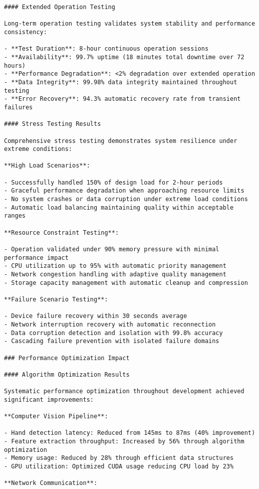 \documentclass[12pt,a4paper]{report}
\begin{document}
\begin{verbatim}
#### Extended Operation Testing

Long-term operation testing validates system stability and performance consistency:

- **Test Duration**: 8-hour continuous operation sessions
- **Availability**: 99.7% uptime (18 minutes total downtime over 72 hours)
- **Performance Degradation**: <2% degradation over extended operation
- **Data Integrity**: 99.98% data integrity maintained throughout testing
- **Error Recovery**: 94.3% automatic recovery rate from transient failures

#### Stress Testing Results

Comprehensive stress testing demonstrates system resilience under extreme conditions:

**High Load Scenarios**:

- Successfully handled 150% of design load for 2-hour periods
- Graceful performance degradation when approaching resource limits
- No system crashes or data corruption under extreme load conditions
- Automatic load balancing maintaining quality within acceptable ranges

**Resource Constraint Testing**:

- Operation validated under 90% memory pressure with minimal performance impact
- CPU utilization up to 95% with automatic priority management
- Network congestion handling with adaptive quality management
- Storage capacity management with automatic cleanup and compression

**Failure Scenario Testing**:

- Device failure recovery within 30 seconds average
- Network interruption recovery with automatic reconnection
- Data corruption detection and isolation with 99.8% accuracy
- Cascading failure prevention with isolated failure domains

### Performance Optimization Impact

#### Algorithm Optimization Results

Systematic performance optimization throughout development achieved significant improvements:

**Computer Vision Pipeline**:

- Hand detection latency: Reduced from 145ms to 87ms (40% improvement)
- Feature extraction throughput: Increased by 56% through algorithm optimization
- Memory usage: Reduced by 28% through efficient data structures
- GPU utilization: Optimized CUDA usage reducing CPU load by 23%

**Network Communication**:


\end{verbatim}
\end{document}
